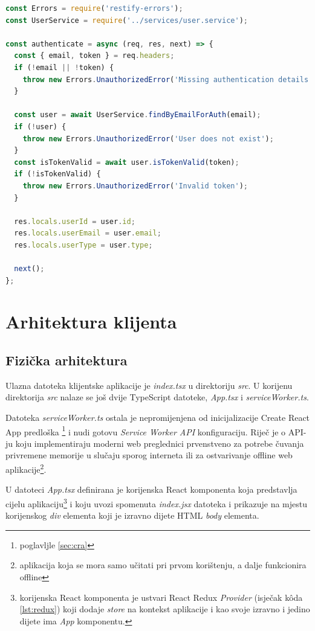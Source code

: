 \documentclass[times, utf8, diplomski, numeric]{fer}
\newcommand{\razmakp}{\vspace{18pt}}
\newcommand{\razmaks}{\vspace{10pt}}
\begin{document}
\razmakp %
\begin{lstlisting}[language=JavaScript, caption={Implementacija \emph{authenticate} metode u \emph{authentication.middleware.js}}, label={lst:auth}]
const Errors = require('restify-errors');
const UserService = require('../services/user.service');

const authenticate = async (req, res, next) => {
  const { email, token } = req.headers;
  if (!email || !token) {
    throw new Errors.UnauthorizedError('Missing authentication details');
  }

  const user = await UserService.findByEmailForAuth(email);
  if (!user) {
    throw new Errors.UnauthorizedError('User does not exist');
  }
  const isTokenValid = await user.isTokenValid(token);
  if (!isTokenValid) {
    throw new Errors.UnauthorizedError('Invalid token');
  }

  res.locals.userId = user.id;
  res.locals.userEmail = user.email;
  res.locals.userType = user.type;

  next();
};
\end{lstlisting}
\razmaks


\newpage
\section{Arhitektura klijenta}

\razmaks
\subsection{Fizička arhitektura}

Ulazna datoteka klijentske aplikacije je \emph{index.tsx} u direktoriju \emph{src}.
U korijenu direktorija \emph{src} nalaze se još dvije TypeScript datoteke, \emph{App.tsx} i \emph{serviceWorker.ts}.

Datoteka \emph{serviceWorker.ts} ostala je nepromijenjena od inicijalizacije Create React App predloška \footnote{poglavljle \ref{sec:cra}} i nudi gotovu \emph{Service Worker API} konfiguraciju.
Riječ je o API-ju koju implementiraju moderni web preglednici prvenstveno za potrebe čuvanja privremene memorije  u slučaju sporog interneta ili za ostvarivanje offline web aplikacije\footnote{
    aplikacija koja se mora samo učitati pri prvom korištenju, a dalje funkcionira offline
}.

U datoteci \emph{App.tsx} definirana je korijenska React komponenta koja predstavlja cijelu aplikaciju\footnote{
    korijenska React komponenta je ustvari React Redux \emph{Provider} (isječak kôda \ref{lst:redux}) koji dodaje \emph{store} na kontekst aplikacije i kao svoje izravno i jedino dijete ima \emph{App} komponentu.
} i koju uvozi  spomenuta \emph{index.jsx} datoteka i prikazuje  na mjestu korijenskog \emph{div} elementa koji je izravno dijete HTML \emph{body} elementa.
\end{document}
